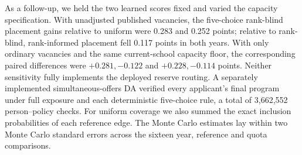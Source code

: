 As a follow-up, we held the two learned scores fixed and varied the capacity specification. With unadjusted published vacancies, the five-choice rank-blind placement gains relative to uniform were 0.283 and 0.252 points; relative to rank-blind, rank-informed placement fell 0.117 points in both years. With only ordinary vacancies and the same current-school capacity floor, the corresponding paired differences were $+0.281,-0.122$ and $+0.228,-0.114$ points. Neither sensitivity fully implements the deployed reserve routing. A separately implemented simultaneous-offers DA verified every applicant's final program under full exposure and each deterministic five-choice rule, a total of 3,662,552 person--policy checks. For uniform coverage we also summed the exact inclusion probabilities of each reference edge. The Monte Carlo estimates lay within two Monte Carlo standard errors across the sixteen year, reference and quota comparisons.
